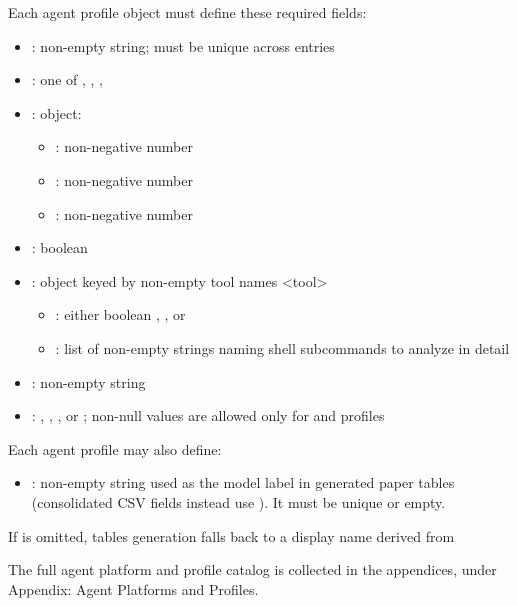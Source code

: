 \documentclass[11pt]{article}
\begin{document}
Each agent profile object must define these required fields:
\begin{itemize}
\item {}: non-empty string; must be unique across entries
\item {}: one of , , , 
\item {}: object:
\begin{itemize}
    \item {}: non-negative number
    \item {}: non-negative number
    \item {}: non-negative number
\end{itemize}
\item {}: boolean
\item {}: object keyed by non-empty tool names <tool>
\begin{itemize}
\item {}: either boolean , , or 
\item {}: list of non-empty strings naming shell subcommands to analyze in detail
\end{itemize}
\item {}: non-empty string
\item {}: , , , or ; non-null values are allowed only for  and  profiles
\end{itemize}

Each agent profile may also define:
\begin{itemize}
\item {}: non-empty string used as the model label in generated paper  tables  (consolidated CSV  fields instead use ). It must be unique or empty.
\end{itemize}

If  is omitted,  tables generation falls back to a display name derived from 

The full agent platform and profile catalog is collected in the appendices, under Appendix: Agent Platforms and Profiles.
\end{document}
